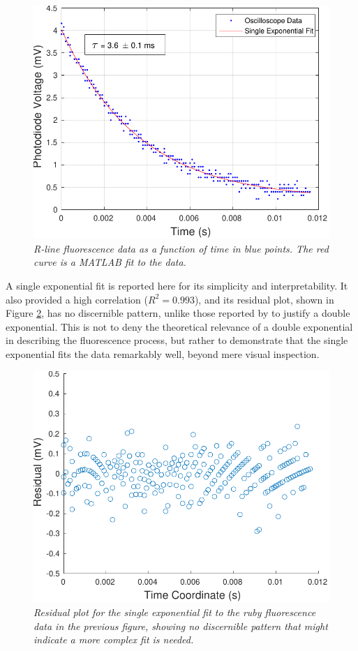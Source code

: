 \documentclass[11pt, a4paper, twocolumn]{article}
\begin{document}
\begin{figure} [t]
\includegraphics[width=\linewidth]{decayFit.pdf}
\caption{\textit{R-line fluorescence data as a function of time in blue points. The red curve is a MATLAB fit to the data.}
}
\label{fig:decayFit}
\end{figure}

A single exponential fit is reported here for its simplicity and interpretability. It also provided a high correlation ($R^2=0.993$), and its residual plot, shown in Figure \ref{fig:decayResiduals}, has no discernible pattern, unlike those reported by \cite{Jones} to justify a double exponential. This is not to deny the theoretical relevance of a double exponential in describing the fluorescence process, but rather to demonstrate that the single exponential fits the data remarkably well, beyond mere visual inspection.

\begin{figure} [H]
\includegraphics[width=\linewidth]{decayResiduals.pdf}
\caption{\textit{Residual plot for the single exponential fit to the ruby fluorescence data in the previous figure, showing no discernible pattern that might indicate a more complex fit is needed.}}
\label{fig:decayResiduals}
\end{figure}
\end{document}
